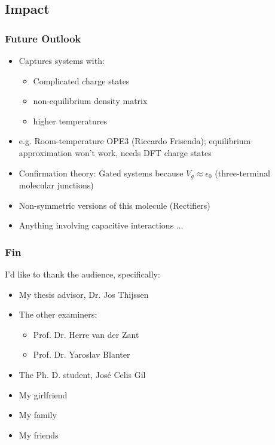 \subsection*{Impact}
\begin{frame}
    \frametitle{Future Outlook} 
    \begin{itemize}
    \item Captures systems with:
        \begin{itemize}
            \item Complicated charge states
            \item non-equilibrium density matrix
            \item higher temperatures
        \end{itemize}
    \item e.g. Room-temperature OPE3 (Riccardo Frisenda); equilibrium approximation won't work, needs DFT charge states
    \item Confirmation theory: Gated systems because $V_g\approx \epsilon_0$ (three-terminal molecular junctions)
    \item Non-symmetric versions of this molecule (Rectifiers)
    \item Anything involving capacitive interactions $\ldots$
    \end{itemize}
\end{frame}  
\begin{frame}
    \frametitle{Fin}
    I'd like to thank the audience, specifically:
    \begin{itemize}
        \item My thesis advisor, Dr. Jos Thijssen
        \item The other examiners:
        \begin{itemize}
            \item Prof. Dr. Herre van der Zant
            \item Prof. Dr. Yaroslav Blanter
        \end{itemize}
        \item The Ph. D. student, Jos\'e Celis Gil
        \item My girlfriend
        \item My family
        \item My friends
    \end{itemize} 
\end{frame}
